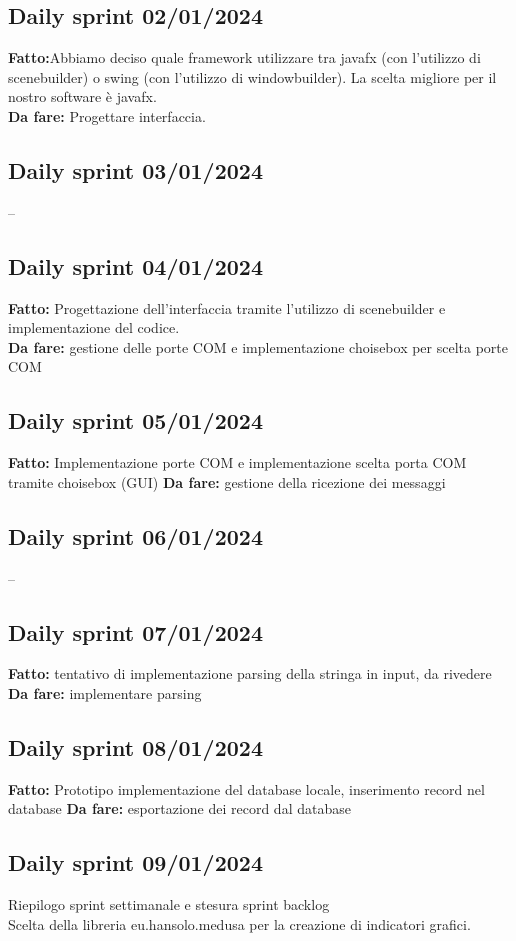 \documentclass{report}
\begin{document}
\subsection{Daily sprint 02/01/2024}
\textbf{Fatto:}Abbiamo deciso quale framework utilizzare tra javafx (con l'utilizzo di scenebuilder) o swing (con l'utilizzo di windowbuilder). La scelta migliore per il nostro software è javafx.\\
\textbf{Da fare:} Progettare interfaccia.
\subsection{Daily sprint 03/01/2024}
--
\subsection{Daily sprint 04/01/2024}
\textbf{Fatto:} Progettazione dell'interfaccia tramite l'utilizzo di scenebuilder e implementazione del codice.\\
\textbf{Da fare:} gestione delle porte COM e implementazione choisebox per scelta porte COM
\subsection{Daily sprint 05/01/2024}
\textbf{Fatto:} Implementazione porte COM e implementazione scelta porta COM tramite choisebox (GUI)
\textbf{Da fare:} gestione della ricezione dei messaggi
\subsection{Daily sprint 06/01/2024}
--
\subsection{Daily sprint 07/01/2024}
\textbf{Fatto:} tentativo di implementazione parsing della stringa in input, da rivedere
\textbf{Da fare:} implementare parsing
\subsection{Daily sprint 08/01/2024}
\textbf{Fatto:} Prototipo implementazione del database locale, inserimento record nel database
\textbf{Da fare:} esportazione dei record dal database
\subsection{Daily sprint 09/01/2024}
Riepilogo sprint settimanale e stesura sprint backlog\\
Scelta della libreria eu.hansolo.medusa per la creazione di indicatori grafici.\\\\
\end{document}
